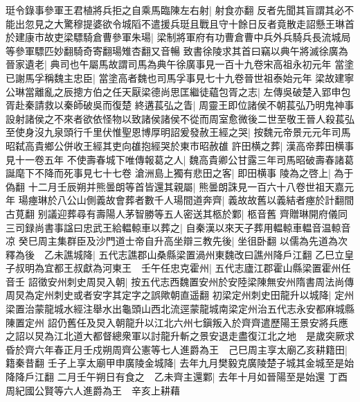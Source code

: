 珽令錄事參軍王君植將兵拒之自乘馬臨陳左右射|{
	射食亦翻}
反者先聞其盲謂其必不能出忽見之大驚穆提婆欲令城䧟不遣援兵珽且戰且守十餘日反者竟散走詔懸王琳首於建康市故吏梁驃騎倉曹參軍朱瑒|{
	梁制將軍府有功曹倉曹中兵外兵騎兵長流城局等參軍驃匹妙翻騎奇寄翻瑒雉杏翻又音暢}
致書徐陵求其首曰竊以典午將滅徐廣為晉家遺老|{
	典司也午屬馬故謂司馬為典午徐廣事見一百十九卷宋高祖永初元年}
當塗已謝馬孚稱魏主忠臣|{
	當塗高者魏也司馬孚事見七十九卷晉世祖泰始元年}
梁故建寧公琳當離亂之辰摠方伯之任天厭梁德尚思匡繼徒藴包胥之志|{
	左傳吳破楚入郢申包胥赴秦請救以秦師破吳而復楚}
終遘萇弘之眚|{
	周靈王即位諸侯不朝萇弘乃明鬼神事設射諸侯之不來者欲依怪物以致諸侯諸侯不從而周室愈微後二世至敬王晉人殺萇弘}
至使身沒九泉頭行千里伏惟聖恩博厚明詔爰發赦王經之哭|{
	按魏元帝景元元年司馬昭弑高貴鄉公併收王經其吏向䧺抱經哭於東市昭赦䧺}
許田横之葬|{
	漢高帝葬田横事見十一卷五年}
不使壽春城下唯傳報葛之人|{
	魏高貴卿公甘露三年司馬昭破壽春諸葛誕麾下不降而死事見七十七卷}
滄洲島上獨有悲田之客|{
	即田横事}
陵為之啓上|{
	為于偽翻}
十二月壬辰朔并熊曇朗等首皆還其親屬|{
	熊曇朗誅見一百六十八卷世祖天嘉元年}
瑒瘞琳於八公山側義故會葬者數千人瑒間道奔齊|{
	義故故舊以義結者瘞於計翻間古莧翻}
别議迎葬尋有壽陽人茅智勝等五人密送其柩於鄴|{
	柩音舊}
齊贈琳開府儀同三司録尚書事諡曰忠武王給輼輬車以葬之|{
	自秦漢以來天子葬用輼輬車輼音温輬音凉}
癸巳周主集群臣及沙門道士帝自升高坐辯三教先後|{
	坐徂卧翻}
以儒為先道為次釋為後　乙未譙城降|{
	五代志譙郡山桑縣梁置渦州東魏改曰譙州降戶江翻}
乙巳立皇子叔明為宜都王叔獻為河東王　壬午任忠克霍州|{
	五代志廬江郡霍山縣梁置霍州任音壬}
詔徵安州刺史周炅入朝|{
	按五代志西魏置安州於安陸梁陳無安州隋書周法尚傳周炅為定州刺史或者安字其定字之誤歟朝直遥翻}
初梁定州刺史田龍升以城降|{
	定州梁置治蒙龍城水經注舉水出龜頭山西北流逕蒙龍城南梁定州治五代志永安都麻城縣陳置定州}
詔仍舊任及炅入朝龍升以江北六州七鎭叛入於齊齊遣歷陽王景安將兵應之詔以炅為江北道大都督總衆軍以討龍升斬之景安退走盡復江北之地　是歲突厥求昏於齊六年春正月壬戍朔周齊公憲等七人進爵為王　己巳周主享太廟乙亥耕籍田|{
	籍秦昔翻}
壬子上享太廟甲申廣陵金城降|{
	去年九月樊毅克廣陵楚子城其金城至是始降降戶江翻}
二月壬午朔日有食之　乙未齊主還鄴|{
	去年十月如晉陽至是始還}
丁酉周紀國公賢等六人進爵為王　辛亥上耕藉

